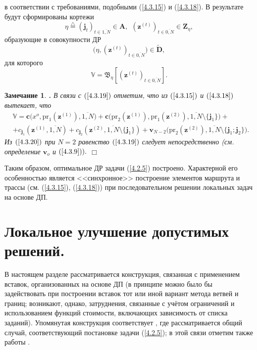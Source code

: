 \documentclass[12pt]{report}
\newcommand{\bfn}{\begin{equation}}
\newcommand{\efn}{\end{equation}}
\newcommand{\df}{\stackrel{\triangle}{=}}
\newcommand{\ov}{\overline}
\newcounter{theo}
\newcounter{zam}
\newtheorem{zam}{Замечание}[section]
\newcommand{\TL}{\mbox{\bf{$\!\!$.}}}
\newcommand{\sm}{\setminus}
\begin{document}
{в соответствии с требованиями, подобными (\ref{4.3.15}) и (\ref{4.3.18}). В результате будут
сформированы кортежи
$$\eta\df (\mathbf{j}_t)_{t\in\ov{1,N}}\in \mathbf{A},\ \ (\mathbf{z}^{(t)})_{t\in \ov{0,N}}\in \mathbf{Z}_\eta,
$$
образующие в совокупности ДР
$$\bigl(\eta, (\mathbf{z}^{(t)})_{t\in \ov{0,N}}\bigl)\in \widetilde{\mathbf{D}},
$$
для которого
\bfn\label{4.3.19} \mathbb{V}= \mathfrak{B}_\eta[(\mathbf{z}^{(t)})_{t\in \ov{0,N}}].
\efn
\begin{zam}\label{z4.3.1}{\TL}
 В связи с $(\ref{4.3.19})$ отметим, что из $(\ref{4.3.15})$ и $(\ref{4.3.18})$ вытекает, что
\begin{eqnarray}
& \mathbb{V}=\mathbf{c}\bigl(x^o,\mathrm{pr}_1(\mathbf{z}^{(1)}),\ov{1,N}\bigl) +
\mathbf{c}\bigl(\mathrm{pr}_2(\mathbf{z}^{(1)}), \mathrm{pr}_1(\mathbf{z}^{(2)}),\ov{1,N}\sm
\{\mathbf{j}_1\}) +
&\nonumber\\
&+  c_{\mathbf{j}_1}(\mathbf{z}^{(1)},\ov{1,N}) +
c_{\mathbf{j}_2}(\mathbf{z}^{(2)},
\ov{1,N}\sm\{\mathbf{j}_1 \}) +
\mathbf{v}_{N-2}\bigl(\mathrm{pr}_2(\mathbf{z}^{(2)}),\ov{1,N}\sm\{\mathbf{j}_1;\mathbf{j}_2\}\bigl).
&\label{4.3.20}
\end{eqnarray}
 Из $(\ref{4.3.20})$ при $N=2$ равенство $(\ref{4.3.19})$ следует непосредственно (см.
определение $\mathbf{v}_o$ и $(\ref{4.3.9})).$
 \hfill $\Box$
 \end{zam}

Таким образом, оптимальное ДР задачи (\ref{4.2.5}) построено. Характерной его особенностью является
<<синхронное>> построение элементов маршрута и трассы (см. (\ref{4.3.15}), (\ref{4.3.18})) при
последовательном решении локальных задач на основе ДП.


\section{Локальное улучшение допустимых решений.}
\setcounter{equation}{0}

В настоящем разделе рассматривается конструкция, связанная с применением вставок,
организованных на основе ДП (в принципе можно было бы задействовать при построении
вставок тот или иной вариант метода ветвей и границ; возникают, однако, затруднения,
связанные с учётом ограничений и использованием функций стоимости, включающих
зависимость от списка заданий). Упомянутая конструкция соответствует  \cite{Cha13`},
где рассматривается общий случай, соответствующий постановке задачи (\ref{4.2.5});
в этой связи отметим также работы   \cite{Cha14`,Cha15`}.

}
\end{document}

